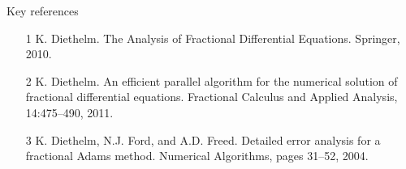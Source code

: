 \documentclass[pdf]{beamer}
\begin{document}
\begin{frame}{Key references}
\begin{itemize}
\item [1] K. Diethelm. The Analysis of Fractional Differential Equations. Springer, 2010.

\item [2] K. Diethelm. An efficient parallel algorithm for the numerical solution of fractional differential equations. Fractional Calculus and Applied Analysis, 14:475–490, 2011.

\item [3] K. Diethelm, N.J. Ford, and A.D. Freed. Detailed error analysis for a fractional Adams method. Numerical
Algorithms, pages 31–52, 2004.
\end{itemize}
\end{frame}
\end{document}
